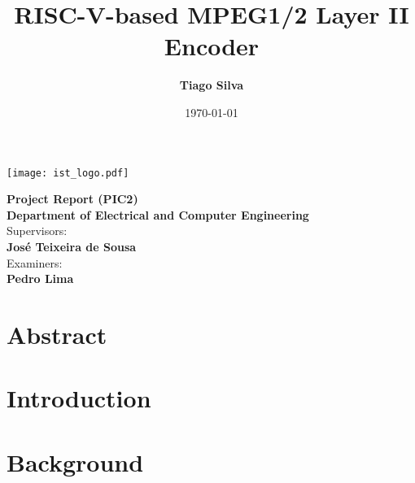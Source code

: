 \documentclass{esda}
\title{\bf \titlefont RISC-V-based MPEG1/2 Layer II Encoder}
\author{\bf \authorfont Tiago Silva}
\date{\today}
\begin{document}
\texttt{[image: ist\_logo.pdf]}
\vspace{2.5cm}

{\let\newpage\relax\maketitle}

\vspace{1.5cm}
\begin{center}
\begin{Large}
  {\bf Project Report (PIC2)}\\
  \vspace{1cm}
  {\bf Department of Electrical and Computer Engineering}\\
  \vspace{1cm}
  Supervisors:\\
  \vspace{0.5cm}
  {\bf José Teixeira de Sousa}\\
  \vspace{1cm}
  Examiners:\\
  \vspace{0.5cm}
  {\bf Pedro Lima}\\
\end{Large}
\end{center}

\cleardoublepage
{}
\setcounter{page}{1}

\section*{Abstract}


\cleardoublepage
\tableofcontents
\listoftables
\listoffigures

\cleardoublepage
{}
\setcounter{page}{1}

\cleardoublepage
\section{Introduction}
\label{sec:intro}


\cleardoublepage
\section{Background}
\label{sec:back}

\end{document}
